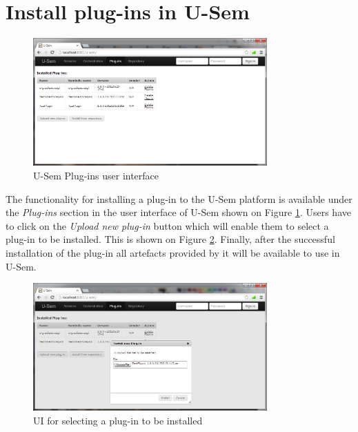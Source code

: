 \section{Install plug-ins in U-Sem}

\begin{figure}
  \centering
    \includegraphics[width=0.8\textwidth]{apendix/PluginTutorial/plugin-list.png}
    \caption{U-Sem Plug-ins user interface}
    \label{plugin-list}
\end{figure}

The functionality for installing a plug-in to the U-Sem platform is available under the \textit{Plug-ins} section in the user interface of U-Sem shown on Figure \ref{plugin-list}. Users have to click on the \textit{Upload new plug-in} button which will enable them to select a plug-in to be installed. This is shown on Figure \ref{plugin-upload}. Finally, after the successful installation of the plug-in all artefacts provided by it will be available to use in U-Sem. 

\begin{figure}
  \centering
    \includegraphics[width=0.8\textwidth]{apendix/PluginTutorial/plugin-upload.png}
    \caption{UI for selecting a plug-in to be installed}
    \label{plugin-upload}
\end{figure}
